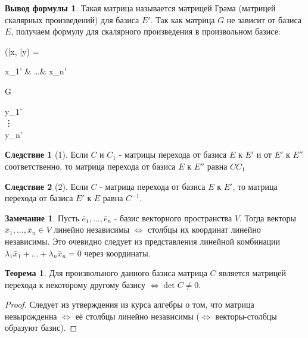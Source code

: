 \documentclass[a4paper, 12pt]{article}
\theoremstyle{definition}
\newtheorem*{theorem}{Теорема}
\newtheorem*{consequense}{Следствие}
\newtheorem*{formula}{Вывод формулы}
\newtheorem*{remark}{Замечание}
\newenvironment{boxedalign*}
  {\begin{equation*}\begin{lrbox}{\boxedalignbox}$\begin{aligned}}
  {\end{aligned}$\end{lrbox}\fbox{\usebox{\boxedalignbox}}\end{equation*}}
\begin{document}
\begin{formula}
		Такая матрица называется матрицей Грама (матрицей скалярных произведений) для базиса $E'$. Так как матрица $G$ не зависит от базиса $E$, получаем формулу для скалярного произведения в произвольном базисе: \begin{boxedalign*}(\bar{x}, \bar{y}) = \begin{pmatrix} x_{1}' & \dots & x_{n}' \end{pmatrix}G\begin{pmatrix} y_{1}' \\ \vdots \\ y_{n}' \end{pmatrix} \end{boxedalign*}
	\end{formula}
	\begin{consequense}[1]
		Если $C$ и $C_{1}$ - матрицы перехода от базиса $E$ к $E'$ и от $E'$ к $E''$ соответственно, то матрица перехода от базиса $E$ к $E''$ равна $CC_{1}$
	\end{consequense}
	\begin{consequense}[2]
		Если $C$ - матрица перехода от базиса $E$ к $E'$, то матрица перехода от базиса $E'$ к $E$ равна $C^{-1}$.
	\end{consequense}
	\begin{remark}
		Пусть $\bar{e}_{1},...,\bar{e}_{n}$ - базис векторного пространства $V$. Тогда векторы $\bar{x}_{1},...,\bar{x}_{n} \in V$ линейно независимы $\Leftrightarrow$ столбцы их координат линейно независимы. Это очевидно следует из представления линейной комбинации $\lambda_{1}\bar{x}_{1} + ... + \lambda_{n}\bar{x}_{n} = 0$ через координаты. 
	\end{remark}
	\begin{theorem}
		Для произвольного данного базиса матрица $C$ является матрицей перехода к некоторому другому базису $\Leftrightarrow \det C \neq 0$. 
	\end{theorem}
	\begin{proof}
		Следует из утверждения из курса алгебры о том, что матрица невырожденна $\Leftrightarrow$ её столбцы линейно независимы ($\Leftrightarrow$ векторы-столбцы образуют базис). 
	\end{proof}
\end{document}
